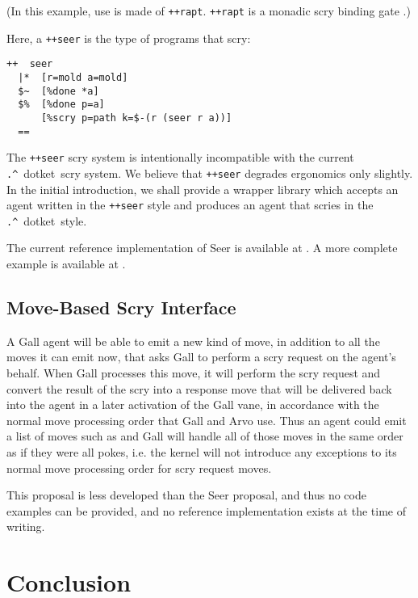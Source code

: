\documentclass[twoside]{article}
\newcommand{\dotket}{\texttt{\string.\string^}~dotket}
\begin{document}
\noindent
(In this example, use is made of \texttt{++rapt}.  \texttt{++rapt} is a monadic scry binding gate \citep{Levan2023b}.)

Here, a \texttt{++seer} is the type of programs that scry:

\begin{lstlisting}
++  seer
  |*  [r=mold a=mold]
  $~  [%done *a]
  $%  [%done p=a]
      [%scry p=path k=$-(r (seer r a))]
  ==
\end{lstlisting}

The \texttt{++seer} scry system is intentionally incompatible with the current \dotket~scry system.  We believe that \texttt{++seer} degrades ergonomics only slightly.  In the initial introduction, we shall provide a wrapper library which accepts an agent written in the \texttt{++seer} style and produces an agent that scries in the \dotket~style.

The current reference implementation of Seer is available at \citet{Levan2023}.  A more complete example is available at \citet{Levan2023a}.

\subsection{Move-Based Scry Interface}

A Gall agent will be able to emit a new kind of move, in addition to all the moves it can emit now, that asks Gall to perform a scry request on the agent's behalf.  When Gall processes this move, it will perform the scry request and convert the result of the scry into a response move that will be delivered back into the agent in a later activation of the Gall vane, in accordance with the normal move processing order that Gall and Arvo use.  Thus an agent could emit a list of moves such as \texttt{} and Gall will handle all of those moves in the same order as if they were all pokes, i.e. the kernel will not introduce any exceptions to its normal move processing order for scry request moves.

This proposal is less developed than the Seer proposal, and thus no code examples can be provided, and no reference implementation exists at the time of writing.


\section{Conclusion}
\end{document}
